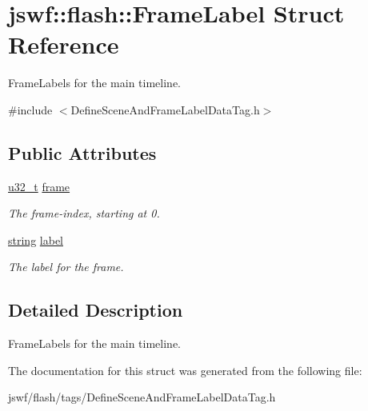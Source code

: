 \hypertarget{structjswf_1_1flash_1_1_frame_label}{\section{jswf\+:\+:flash\+:\+:Frame\+Label Struct Reference}
\label{structjswf_1_1flash_1_1_frame_label}
}


Frame\+Labels for the main timeline.  




{\ttfamily \#include $<$Define\+Scene\+And\+Frame\+Label\+Data\+Tag.\+h$>$}

\subsection*{Public Attributes}
\begin{DoxyCompactItemize}
\item 
\hypertarget{structjswf_1_1flash_1_1_frame_label_a1ed9cb28b04dfd0b787960ae4e0dd08f}{\hyperlink{namespacejswf_ae68dd480b6437e9a20db7b004283a466}{u32\+\_\+t} \hyperlink{structjswf_1_1flash_1_1_frame_label_a1ed9cb28b04dfd0b787960ae4e0dd08f}{frame}}\label{structjswf_1_1flash_1_1_frame_label_a1ed9cb28b04dfd0b787960ae4e0dd08f}

\begin{DoxyCompactList}\small\item\em The frame-\/index, starting at 0. \end{DoxyCompactList}\item 
\hypertarget{structjswf_1_1flash_1_1_frame_label_acb68b843005fa28a5e0ad9b7dd683112}{\hyperlink{namespacejswf_a755127d61081aa8af105eb800aa2c1ec}{string} \hyperlink{structjswf_1_1flash_1_1_frame_label_acb68b843005fa28a5e0ad9b7dd683112}{label}}\label{structjswf_1_1flash_1_1_frame_label_acb68b843005fa28a5e0ad9b7dd683112}

\begin{DoxyCompactList}\small\item\em The label for the frame. \end{DoxyCompactList}\end{DoxyCompactItemize}


\subsection{Detailed Description}
Frame\+Labels for the main timeline. 

The documentation for this struct was generated from the following file\+:\begin{DoxyCompactItemize}
\item 
jswf/flash/tags/Define\+Scene\+And\+Frame\+Label\+Data\+Tag.\+h\end{DoxyCompactItemize}
